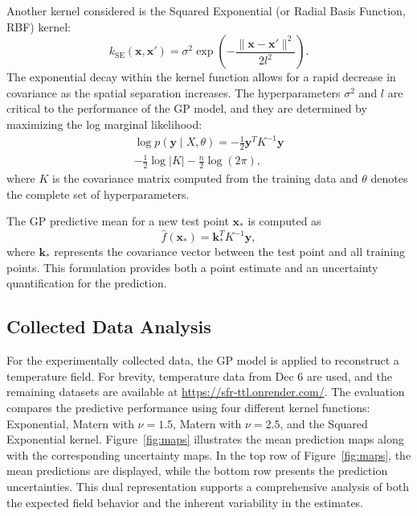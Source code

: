 \documentclass[conference]{IEEEtran}
\begin{document}
    Another kernel considered is the Squared Exponential (or Radial Basis Function, RBF) kernel:
\begin{equation}
    k_{\text{SE}}(\mathbf{x},\mathbf{x}') = \sigma^2 \exp\left(-\frac{\|\mathbf{x}-\mathbf{x}'\|^2}{2l^2}\right).
\end{equation}
    The exponential decay within the kernel function allows for a rapid decrease in covariance as the spatial separation increases. 
    The hyperparameters \(\sigma^2\) and \(l\) are critical to the performance of the GP model, and they are determined by maximizing the log marginal likelihood:
\begin{multline}
    \log p(\mathbf{y}\mid X,\theta) =
    - \frac{1}{2} \mathbf{y}^T K^{-1} \mathbf{y} \\
    - \frac{1}{2} \log\left|K\right| - \frac{n}{2} \log\left(2\pi\right),
\end{multline}
    where \( K \) is the covariance matrix computed from the training data and \( \theta \) denotes the complete set of hyperparameters.

    The GP predictive mean for a new test point \(\mathbf{x}_*\) is computed as
\begin{equation}
    \hat{f}(\mathbf{x}_*) = \mathbf{k}_*^T K^{-1} \mathbf{y},
\end{equation}
    where \(\mathbf{k}_*\) represents the covariance vector between the test point and all training points. This formulation provides both a point estimate and an uncertainty quantification for the prediction.

\subsection{Collected Data Analysis}

    For the experimentally collected data, the GP model is applied to reconstruct a temperature field. 
    For brevity, temperature data from Dec 6 are used, and the remaining datasets are available at \url{https://sfr-ttl.onrender.com/}. 
    The evaluation compares the predictive performance using four different kernel functions: Exponential, Matern with \(\nu=1.5\), Matern with \(\nu=2.5\), and the Squared Exponential kernel. 
    Figure~\ref{fig:maps} illustrates the mean prediction maps along with the corresponding uncertainty maps. In the top row of Figure~\ref{fig:maps}, the mean predictions are displayed, 
    while the bottom row presents the prediction uncertainties. This dual representation supports a comprehensive analysis of both the expected field behavior and the inherent variability in the estimates.
\end{document}
